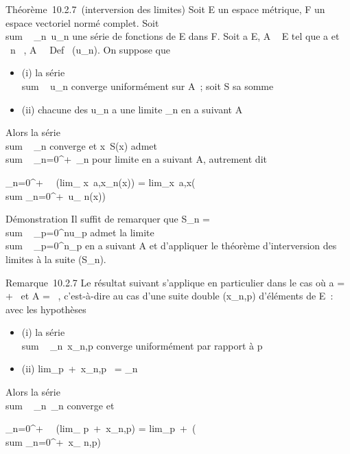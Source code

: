 \documentclass[]{article}
\begin{document}
Théorème~10.2.7~(interversion des limites) Soit E un espace métrique, F
un espace vectoriel normé complet. Soit
\\sum ~
\_n\in{}~u\_n une série de fonctions de E dans F. Soit a \in E,
A \subset~ E tel que a \in\overlineA et
\forall~n \in {}~, A \subset~\ Def~
(u\_n). On suppose que

\begin{itemize}
\itemsep1pt\parskip0pt
\item
  (i) la série \\sum ~
  u\_n converge uniformément sur A~; soit S sa somme
\item
  (ii) chacune des u\_n a une limite \ell\_n en a suivant A
\end{itemize}

Alors la série \\sum ~
\ell\_n converge et x\mapsto~S(x) admet
\\sum ~
\_n=0^+\infty~\ell\_n pour limite en a suivant A, autrement
dit

\sum \_n=0^+\infty~~\left
(lim\_ x\rightarrow~a,x\inAu\_n(x)\right ) =
lim\_x\rightarrow~a,x\inA\left (\\sum
\_n=0^+\infty~u\_ n(x)\right )

Démonstration Il suffit de remarquer que S\_n
= \\sum ~
\_p=0^nu\_p admet la limite
\\sum ~
\_p=0^n\ell\_p en a suivant A et d'appliquer le
théorème d'interversion des limites à la suite (S\_n).

Remarque~10.2.7 Le résultat suivant s'applique en particulier dans le
cas où a = +\infty~ et A = ~, c'est-à-dire au cas d'une suite double
(x\_n,p) d'éléments de E~: avec les hypothèses

\begin{itemize}
\itemsep1pt\parskip0pt
\item
  (i) la série \\sum ~
  \_n\in{}~x\_n,p converge uniformément par rapport à p
\item
  (ii) lim\_p\rightarrow~+\infty~x\_n,p~ =
  \ell\_n
\end{itemize}

Alors la série \\sum ~
\_n\in{}~\ell\_n converge et

\sum \_n=0^+\infty~~\left
(lim\_ p\rightarrow~+\infty~x\_n,p\right ) =
lim\_p\rightarrow~+\infty~\left (\\sum
\_n=0^+\infty~x\_ n,p\right )
\end{document}
